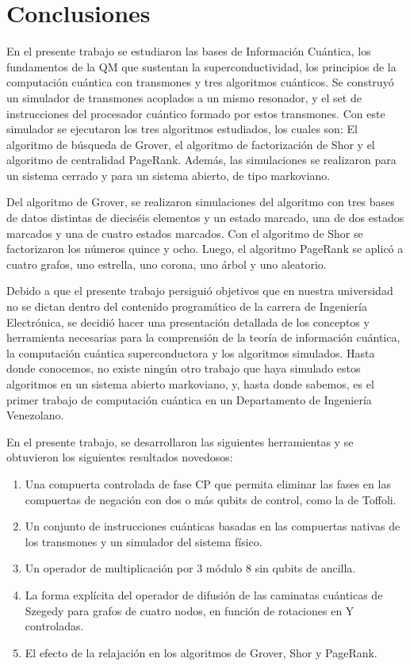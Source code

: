 \chapter{Conclusiones}

En el presente trabajo se estudiaron las bases de Información Cuántica, los fundamentos de la QM que sustentan la superconductividad, los principios de la computación cuántica con transmones y tres algoritmos cuánticos. Se construyó un simulador de transmones acoplados a un mismo resonador, y el set de instrucciones del procesador cuántico formado por estos transmones. Con este simulador se ejecutaron los tres algoritmos estudiados, los cuales son: El algoritmo de búsqueda de Grover, el algoritmo de factorización de Shor y el algoritmo de centralidad PageRank. Además, las simulaciones se realizaron para un sistema cerrado y para un sistema abierto, de tipo markoviano.

Del algoritmo de Grover, se realizaron simulaciones del algoritmo con tres bases de datos distintas de dieciséis elementos y un estado marcado, una de dos estados marcados y una de cuatro estados marcados. Con el algoritmo de Shor se factorizaron los números quince y ocho. Luego, el algoritmo PageRank se aplicó a cuatro grafos, uno estrella, uno corona, uno árbol y uno aleatorio.

Debido a que el presente trabajo persiguió objetivos que en nuestra universidad no se dictan dentro del contenido programático de la carrera de Ingeniería Electrónica, se decidió hacer una presentación detallada de los conceptos y herramienta necesarias para la comprensión de la teoría de información cuántica, la computación cuántica superconductora y los algoritmos simulados. Hasta donde conocemos, no existe ningún otro trabajo que haya simulado estos algoritmos en un sistema abierto markoviano, y, hasta donde sabemos, es el primer trabajo de computación cuántica en un Departamento de Ingeniería Venezolano.

En el presente trabajo, se desarrollaron las siguientes herramientas y se obtuvieron los siguientes resultados novedosos:

\begin{enumerate}
    \item Una compuerta controlada de fase CP que permita eliminar las fases en las compuertas de negación con dos o más qubits de control, como la de Toffoli.
    \item Un conjunto de instrucciones cuánticas basadas en las compuertas nativas de los transmones y un simulador del sistema físico.
    \item Un operador de multiplicación por 3 módulo 8 sin qubits de ancilla.
    \item La forma explícita del operador de difusión de las caminatas cuánticas de Szegedy para grafos de cuatro nodos, en función de rotaciones en Y controladas.
    \item El efecto de la relajación en los algoritmos de Grover, Shor y PageRank.
\end{enumerate}

